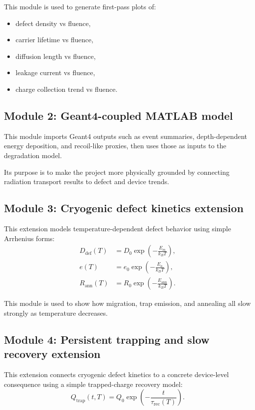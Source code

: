\documentclass[11pt]{article}
\begin{document}
This module is used to generate first-pass plots of:
\begin{itemize}[leftmargin=2em]
    \item defect density vs fluence,
    \item carrier lifetime vs fluence,
    \item diffusion length vs fluence,
    \item leakage current vs fluence,
    \item charge collection trend vs fluence.
\end{itemize}

\subsection{Module 2: Geant4-coupled MATLAB model}
This module imports Geant4 outputs such as event summaries, depth-dependent energy deposition, and recoil-like proxies, then uses those as inputs to the degradation model.

Its purpose is to make the project more physically grounded by connecting radiation transport results to defect and device trends.

\subsection{Module 3: Cryogenic defect kinetics extension}
This extension models temperature-dependent defect behavior using simple Arrhenius forms:
\begin{align}
D_{\mathrm{def}}(T) &= D_0 \exp\left(-\frac{E_m}{k_B T}\right), \\
e(T) &= e_0 \exp\left(-\frac{E_a}{k_B T}\right), \\
R_{\mathrm{ann}}(T) &= R_0 \exp\left(-\frac{E_{\mathrm{ann}}}{k_B T}\right).
\end{align}

This module is used to show how migration, trap emission, and annealing all slow strongly as temperature decreases.

\subsection{Module 4: Persistent trapping and slow recovery extension}
This extension connects cryogenic defect kinetics to a concrete device-level consequence using a simple trapped-charge recovery model:
\begin{equation}
Q_{\mathrm{trap}}(t,T) = Q_0 \exp\left(-\frac{t}{\tau_{\mathrm{rec}}(T)}\right).
\end{equation}
\end{document}
